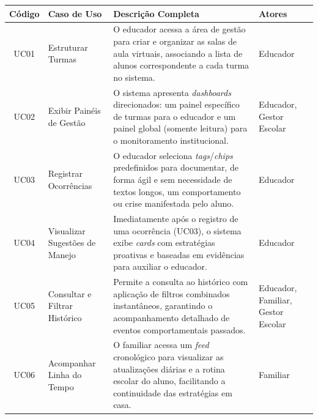 \begin{quadro}[H]
    \centering
    \caption{Quadro de Casos de Uso do Sistema TEia}
    \label{quadro:casos_uso_sistema}
    \renewcommand{\arraystretch}{1.5} %
    \small %
    
    \begin{tabular}{|c|p{3.2cm}|p{7cm}|p{2.8cm}|}
        \hline
        \textbf{Código} & \textbf{Caso de Uso} & \textbf{Descrição Completa} & \textbf{Atores} \\ \hline
        
        UC01 & Estruturar Turmas & O educador acessa a área de gestão para criar e organizar as salas de aula virtuais, associando a lista de alunos correspondente a cada turma no sistema. & Educador \\ \hline
        
        UC02 & Exibir Painéis de Gestão & O sistema apresenta \textit{dashboards} direcionados: um painel específico de turmas para o educador e um painel global (somente leitura) para o monitoramento institucional. & Educador, Gestor Escolar \\ \hline
        
        UC03 & Registrar Ocorrências & O educador seleciona \textit{tags}/\textit{chips} predefinidos para documentar, de forma ágil e sem necessidade de textos longos, um comportamento ou crise manifestada pelo aluno. & Educador \\ \hline
        
        UC04 & Visualizar Sugestões de Manejo & Imediatamente após o registro de uma ocorrência (UC03), o sistema exibe \textit{cards} com estratégias proativas e baseadas em evidências para auxiliar o educador. & Educador \\ \hline
        
        UC05 & Consultar e Filtrar Histórico & Permite a consulta ao histórico com aplicação de filtros combinados instantâneos, garantindo o acompanhamento detalhado de eventos comportamentais passados. & Educador, Familiar, Gestor Escolar \\ \hline
        
        UC06 & Acompanhar Linha do Tempo & O familiar acessa um \textit{feed} cronológico para visualizar as atualizações diárias e a rotina escolar do aluno, facilitando a continuidade das estratégias em casa. & Familiar \\ \hline
        

\end{tabular}
\end{quadro}
